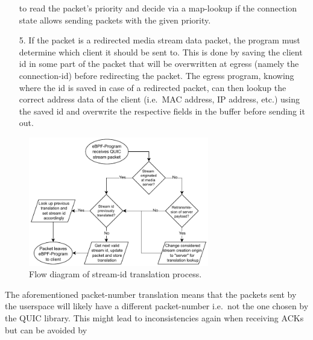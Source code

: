 \begin{enumerate}
                        to read the packet's priority and decide via a map-lookup if the connection 
                        state allows sending packets with the given priority.
    \item[5.] If the packet is a redirected media stream data packet, the program must determine 
            which client it should be sent to. 
            This is done by saving the client id in some part of the packet that will be 
            overwritten at egress (namely the connection-id) before redirecting the packet.
            The egress program, knowing where the id is saved in case of a redirected packet, can then
            lookup the correct address data of the client (i.e.~MAC address, IP address, etc.) using 
            the saved id and overwrite the respective fields in the buffer before sending it out.
\end{enumerate}
\vspace{0.5cm}
\begin{figure}[H]
    \centering
    \includegraphics[width=0.7\textwidth]{figures/03_fast_relays/stream-id-translation.drawio.pdf}
    \caption[Stream-id translation schematic]{Flow diagram of stream-id translation process.}\label{fig:stream-id-translation}
\end{figure}
The aforementioned packet-number translation means that the packets sent by the userspace will likely have a different packet-number i.e.~not the one chosen by the QUIC library.
This might lead to inconsistencies again when receiving ACKs but can be avoided by 
